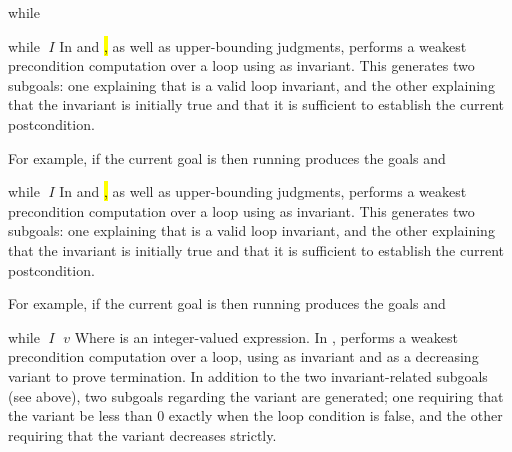 \begin{tactic}{while}
  \begin{tsyntax}{while $\;I$}
  In \prhl and \hl, as well as upper-bounding \phl judgments, performs
  a weakest precondition computation over a loop using  as
  invariant. This generates two subgoals: one explaining that 
  is a valid loop invariant, and the other explaining that the
  invariant is initially true and that it is sufficient to establish
  the current postcondition.

  \bigskip
  For example, if the current goal is
   then
  running 
  produces the goals
  and
  \end{tsyntax}

  \begin{tsyntax}{while $\;I$}
  In \prhl and \hl, as well as upper-bounding \phl judgments, performs
  a weakest precondition computation over a loop using  as
  invariant. This generates two subgoals: one explaining that 
  is a valid loop invariant, and the other explaining that the
  invariant is initially true and that it is sufficient to establish
  the current postcondition.

  \bigskip
  For example, if the current goal is
   then
  running 
  produces the goals
  and
  \end{tsyntax}

  \begin{tsyntax}{while $\;I$ $\;v$}
  Where  is an integer-valued expression. In \phl, performs a
  weakest precondition computation over a loop, using  as
  invariant and  as a decreasing variant to prove
  termination. In addition to the two invariant-related subgoals (see
  above), two subgoals regarding the variant are generated; one
  requiring that the variant be less than 0 exactly when the loop
  condition is false, and the other requiring that the variant
  decreases strictly.
  \end{tsyntax}
\end{tactic}
